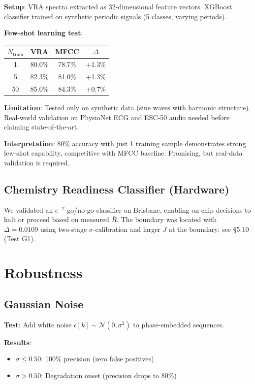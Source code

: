 \documentclass[10pt,twocolumn]{article}
\begin{document}
\textbf{Setup}: VRA spectra extracted as 32-dimensional feature vectors. XGBoost classifier trained on synthetic periodic signals (5 classes, varying periods).

\textbf{Few-shot learning test}:
\begin{center}
\footnotesize
\begin{tabular}{cccc}
\toprule
$N_{\text{train}}$ & VRA & MFCC & $\Delta$ \\
\midrule
1 & 80.0\% & 78.7\% & +1.3\% \\
5 & 82.3\% & 81.0\% & +1.3\% \\
50 & 85.0\% & 84.3\% & +0.7\% \\
\bottomrule
\end{tabular}
\end{center}

\textbf{Limitation}: Tested only on synthetic data (sine waves with harmonic structure). Real-world validation on PhysioNet ECG and ESC-50 audio needed before claiming state-of-the-art.

\textbf{Interpretation}: 80\% accuracy with just 1 training sample demonstrates strong few-shot capability, competitive with MFCC baseline. Promising, but real-data validation is required.

\subsection{Chemistry Readiness Classifier (Hardware)}

We validated an $e^{-2}$ go/no-go classifier on Brisbane, enabling on-chip decisions to halt or proceed based on measured $\bar{R}$. The boundary was located with $\Delta = 0.0109$ using two-stage $\sigma$-calibration and larger $J$ at the boundary; see \S5.10 (Test G1).

\section{Robustness}

\subsection{Gaussian Noise}

\textbf{Test}: Add white noise $\epsilon[k] \sim \mathcal{N}(0, \sigma^2)$ to phase-embedded sequences.

\textbf{Results}:
\begin{itemize}
\item $\sigma \le 0.50$: 100\% precision (zero false positives)
\item $\sigma > 0.50$: Degradation onset (precision drops to 80\%)
\end{itemize}
\end{document}

